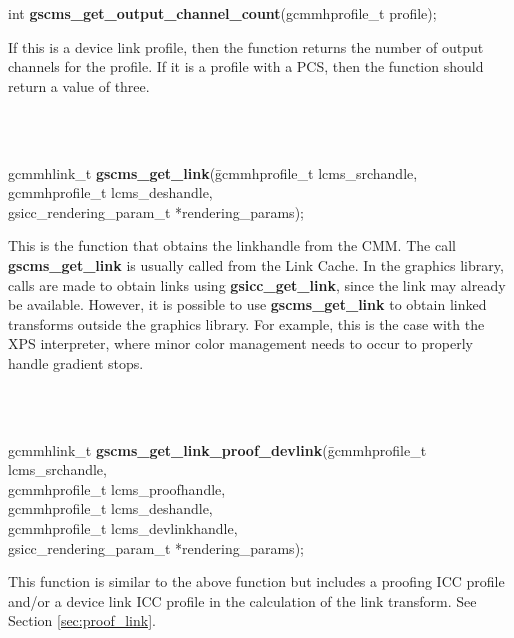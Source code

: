 \documentclass[12pt,notitlepage]{article}
\begin{document}
\noindent int {\bf gscms\_get\_output\_channel\_count}(gcmmhprofile\_t profile);\\

\begin{minipage}[h]{6.0in}
If this is a device link profile, then the function returns the number of output channels for the profile.  If it is a profile with a PCS, then the function should return a value of three.
\end{minipage}\\
\\

\begin{tabbing}
\noindent gcmmhlink\_t {\bf gscms\_get\_link}(\=gcmmhprofile\_t  lcms\_srchandle, gcmmhprofile\_t
lcms\_deshandle, \\
\> gsicc\_rendering\_param\_t
*rendering\_params);\\
\end{tabbing}

\begin{minipage}[h]{6.0in}
This is the function that obtains the linkhandle from the CMM.  The call {\bf gscms\_get\_link} is usually called from the Link Cache.  In the graphics library, calls are made to obtain links using {\bf gsicc\_get\_link}, since the link may already be available.  However, it is possible to use {\bf gscms\_get\_link} to obtain linked transforms outside the graphics library.  For example, this is the case with the XPS interpreter, where minor color management needs to occur to properly handle gradient stops.
\end{minipage}\\
\\

\begin{tabbing}
\noindent gcmmhlink\_t {\bf gscms\_get\_link\_proof\_devlink}(\=gcmmhprofile\_t  lcms\_srchandle,\\
\> gcmmhprofile\_t lcms\_proofhandle,\\
\> gcmmhprofile\_t lcms\_deshandle,\\
\> gcmmhprofile\_t lcms\_devlinkhandle,\\
\> gsicc\_rendering\_param\_t *rendering\_params);\\
\end{tabbing}

\begin{minipage}[h]{6.0in}
This function is similar to the above function but includes a proofing ICC profile and/or a device link ICC profile in the calculation of the link transform.  See Section \ref{sec:proof_link}.
\end{minipage}\\
\\
\end{document}
